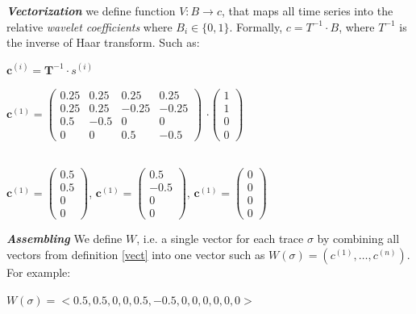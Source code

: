 \begin{definition}{\textit{\textbf{Vectorization}}} \label{vect}
 we define function $V: B \to c$, that maps all time series into the relative \textit{wavelet coefficients}  where $B_i \in \{0,1\}$. Formally, $c = T^{-1} \cdot B$, where $T^{-1}$ is the inverse of Haar transform. Such as:
 
 \begin{center}
 	$\textbf{c}^{(i)} = \textbf{T}^{-1} \cdot s^{(i)}$\\
 	\vline
 	
 	$\textbf{c}^{(1)} = \begin{pmatrix}
 	0.25 & 0.25 & 0.25 & 0.25 \\
 	0.25 & 0.25 & -0.25 & -0.25 \\
 	0.5 & -0.5 & 0 & 0 \\
 	0 & 0 & 0.5 & -0.5  	
 	\end{pmatrix}$ $\cdot  \begin{pmatrix}
 		1 \\
 		1 \\
 		0 \\
 		0  	
 	\end{pmatrix}$\\
 	\vline\\
 	\vline
 	
 	$\textbf{c}^{(1)}=
 	\begin{pmatrix}
 		0.5 \\
 		0.5 \\
 		0 \\
 		0  	
 	\end{pmatrix}$, $\textbf{c}^{(1)}=
 \begin{pmatrix}
 0.5 \\
 -0.5 \\
 0 \\
 0  	
\end{pmatrix}$, $\textbf{c}^{(1)}=
\begin{pmatrix}
0 \\
0 \\
0 \\
0  	
\end{pmatrix} $

 \end{center}

\end{definition}


\begin{definition}{\textit{\textbf{Assembling}}} \label{ass}
	 We define $W$, i.e. a single vector for each trace $\sigma$ by combining all vectors from definition \ref{vect} into one vector such as $W(\sigma) = (c^{(1)}, \dots , c^{(n)}).$ For example:	
	 \begin{center}
	 	$W(\sigma) = <0.5, 0.5, 0, 0, 0.5, -0.5, 0, 0, 0, 0, 0, 0 >$
	 \end{center}
	 
\end{definition}

